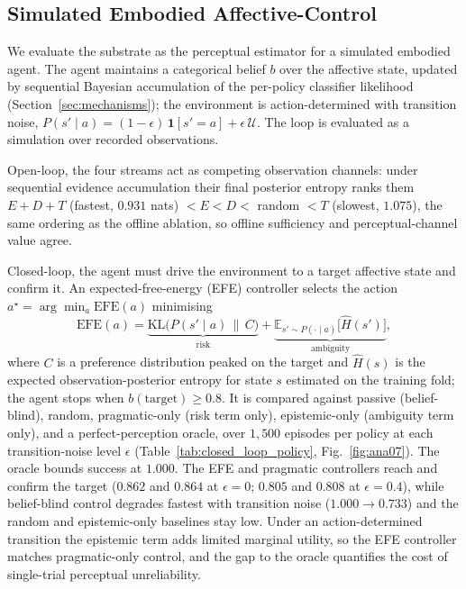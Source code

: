 \documentclass[journal]{IEEEtran}
\begin{document}
\subsection{Simulated Embodied Affective-Control}\label{sec:pillarD}\label{sec:embodied_results}
We evaluate the substrate as the perceptual estimator for a simulated embodied agent. The agent maintains a categorical belief $b$ over the affective state, updated by sequential Bayesian accumulation of the per-policy classifier likelihood (Section~\ref{sec:mechanisms}); the environment is action-determined with transition noise, $P(s'\mid a)=(1-\epsilon)\,\mathbf{1}[s'{=}a]+\epsilon\,\mathcal{U}$. The loop is evaluated as a simulation over recorded observations.

Open-loop, the four streams act as competing observation channels: under sequential evidence accumulation their final posterior entropy ranks them $E{+}D{+}T$ (fastest, $0.931$ nats) $<E<D<$ random $<T$ (slowest, $1.075$), the same ordering as the offline ablation, so offline sufficiency and perceptual-channel value agree.

Closed-loop, the agent must drive the environment to a target affective state and confirm it. An expected-free-energy (EFE) controller selects the action $a^\star=\arg\min_a\mathrm{EFE}(a)$ minimising
\begin{equation}
\mathrm{EFE}(a)=\underbrace{\mathrm{KL}\!\big(P(s'\mid a)\,\|\,C\big)}_{\text{risk}}+\underbrace{\mathbb{E}_{s'\sim P(\cdot\mid a)}\big[\hat H(s')\big]}_{\text{ambiguity}},
\label{eq:efe}
\end{equation}
where $C$ is a preference distribution peaked on the target and $\hat H(s)$ is the expected observation-posterior entropy for state $s$ estimated on the training fold; the agent stops when $b(\text{target})\geq 0.8$. It is compared against passive (belief-blind), random, pragmatic-only (risk term only), epistemic-only (ambiguity term only), and a perfect-perception oracle, over $1{,}500$ episodes per policy at each transition-noise level $\epsilon$ (Table~\ref{tab:closed_loop_policy}, Fig.~\ref{fig:ana07}). The oracle bounds success at $1.000$. The EFE and pragmatic controllers reach and confirm the target ($0.862$ and $0.864$ at $\epsilon=0$; $0.805$ and $0.808$ at $\epsilon=0.4$), while belief-blind control degrades fastest with transition noise ($1.000\!\to\!0.733$) and the random and epistemic-only baselines stay low. Under an action-determined transition the epistemic term adds limited marginal utility, so the EFE controller matches pragmatic-only control, and the gap to the oracle quantifies the cost of single-trial perceptual unreliability.
\end{document}
